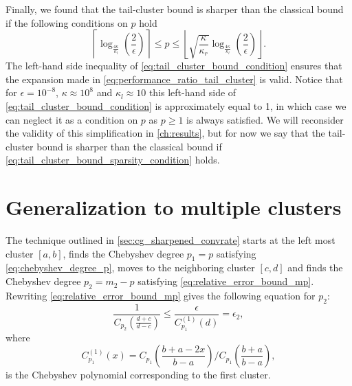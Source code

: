 Finally, we found that the tail-cluster bound is sharper than the classical bound if the following conditions on $p$ hold
\begin{equation}
    \left\lceil\log_{\frac{4\kappa}{\kappa_l}}\left(\frac{2}{\epsilon}\right)\right\rceil \leq p \leq \left\lfloor\sqrt{\frac{\kappa}{\kappa_r}}\log_{\frac{4\kappa}{\kappa_l}}\left(\frac{2}{\epsilon}\right)\right\rfloor.
    \label{eq:tail_cluster_bound_condition}
\end{equation}
The left-hand side inequality of \cref{eq:tail_cluster_bound_condition} ensures that the expansion made in \cref{eq:performance_ratio_tail_cluster} is valid. Notice that for $\epsilon = 10^{-8}$, $\kappa\approx 10^{8}$ and $\kappa_l\approx 10$ this left-hand side of \cref{eq:tail_cluster_bound_condition} is approximately equal to 1, in which case we can neglect it as a condition on $p$ as $p\geq 1$ is always satisfied. We will reconsider the validity of this simplification in \cref{ch:results}, but for now we say that the tail-cluster bound is sharper than the classical bound if \cref{eq:tail_cluster_bound_sparsity_condition} holds.

\section{Generalization to multiple clusters}\label{sec:multiple_clusters}
The technique outlined in \cref{sec:cg_sharpened_convrate} starts at the left most cluster $[a,b]$, finds the Chebyshev degree $p_1=p$ satisfying \cref{eq:chebyshev_degree_p}, moves to the neighboring cluster $[c,d]$ and finds the Chebyshev degree $p_2 = m_2 - p$ satisfying \cref{eq:relative_error_bound_mp}. Rewriting \cref{eq:relative_error_bound_mp} gives the following equation for $p_2$:
\begin{equation}
    \frac{1}{C_{p_2}\left(\frac{d+c}{d-c}\right)} \leq \frac{\epsilon}{{C}^{(1)}_{p_1}(d)} = \epsilon_2,
    \label{eq:chebyshev_degree_p_prime}
\end{equation}
where
\[
    C^{(1)}_{p_1}(x) = C_{p_1}\left(\frac{b + a - 2x}{b - a}\right) /C_{p_1}\left(\frac{b+a}{b-a}\right),
\]
is the Chebyshev polynomial corresponding to the first cluster.

